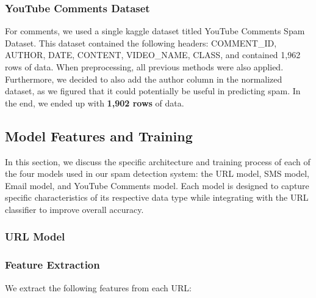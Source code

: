 \documentclass{article}
\begin{document}
\subsubsection{YouTube Comments Dataset}
For comments, we used a single kaggle dataset titled YouTube Comments Spam Dataset. This dataset contained the following headers: COMMENT\_ID, AUTHOR, DATE, CONTENT, VIDEO\_NAME, CLASS, and contained 1,962 rows of data.
\newline
\newline
\noindent
When preprocessing, all previous methods were also applied. Furthermore, we decided to also add the author column in the normalized dataset, as we figured that it could potentially be useful in predicting spam. In the end, we ended up with \textbf{1,902 rows} of data.

\subsection{Model Features and Training}

In this section, we discuss the specific architecture and training process of each of the four models used in our spam detection system: the URL model, SMS model, Email model, and YouTube Comments model. Each model is designed to capture specific characteristics of its respective data type while integrating with the URL classifier to improve overall accuracy.

\subsubsection{URL Model}

\subsubsection*{Feature Extraction}

We extract the following features from each URL:
\end{document}

